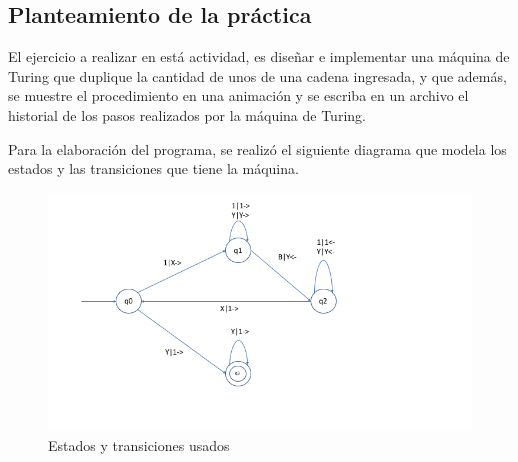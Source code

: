 \subsection{Planteamiento de la práctica}
	El ejercicio a realizar en está actividad, es diseñar e implementar una máquina de Turing que duplique la cantidad de unos de una cadena ingresada, y que además, se muestre el procedimiento en una animación y se escriba en un archivo el historial de los pasos realizados por la máquina de Turing.
	
	
	Para la elaboración del programa, se realizó el siguiente diagrama que modela los estados y las transiciones que tiene la máquina.
	
	\begin{figure}[H]
		\begin{center}
			\includegraphics[scale=.5]{MT/img/maquina.png}
			\caption{Estados y transiciones usados}
			\label{fig:maquina}
		\end{center}
	\end{figure}
	